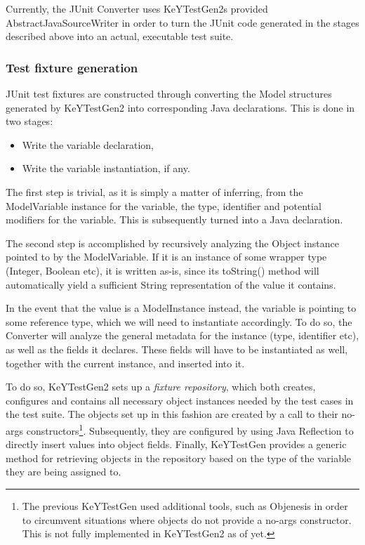 \documentclass{article}
\newcommand{\tmem}[1]{{\em #1\/}}
\newenvironment{itemizedot}{\begin{itemize} \renewcommand{\labelitemi}{$\bullet$}\renewcommand{\labelitemii}{$\bullet$}\renewcommand{\labelitemiii}{$\bullet$}\renewcommand{\labelitemiv}{$\bullet$}}{\end{itemize}}
\begin{document}
Currently, the JUnit Converter uses KeYTestGen2s provided
AbstractJavaSourceWriter in order to turn the JUnit code generated in the
stages described above into an actual, executable test suite.



\subsubsection{Test fixture generation}

JUnit test fixtures are constructed through converting the Model structures
generated by KeYTestGen2 into corresponding Java declarations. This is done in
two stages:
\begin{itemizedot}
  \item Write the variable declaration,
  
  \item Write the variable instantiation, if any.
\end{itemizedot}
The first step is trivial, as it is simply a matter of inferring, from the
ModelVariable instance for the variable, the type, identifier and potential
modifiers for the variable. This is subsequently turned into a Java
declaration.



The second step is accomplished by recursively analyzing the Object instance
pointed to by the ModelVariable. If it is an instance of some wrapper type
(Integer, Boolean etc), it is written as-is, since its toString() method will
automatically yield a sufficient String representation of the value it
contains.

In the event that the value is a ModelInstance instead, the variable is
pointing to some reference type, which we will need to instantiate
accordingly. To do so, the Converter will analyze the general metadata for the
instance (type, identifier etc), as well as the fields it declares. These
fields will have to be instantiated as well, together with the current
instance, and inserted into it.



To do so, KeYTestGen2 sets up a {\tmem{fixture repository}}, which both
creates, configures and contains all necessary object instances needed by the
test cases in the test suite. The objects set up in this fashion are created
by a call to their no-args constructors{\footnote{The previous KeYTestGen used
additional tools, such as Objenesis {\cite{ObjenesisWebsite}} in order to
circumvent situations where objects do not provide a no-args constructor. This
is not fully implemented in KeYTestGen2 as of yet.}}. Subsequently, they are
configured by using Java Reflection to directly insert values into object
fields. Finally, KeYTestGen provides a generic method for retrieving objects
in the repository based on the type of the variable they are being assigned
to.
\end{document}
